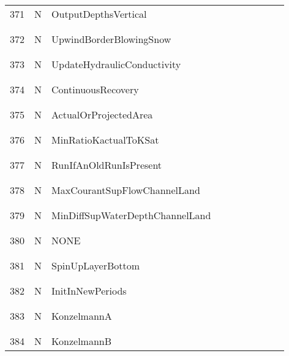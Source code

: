 \begin{longtable}{|c|c|l|c|c|c|c|p{}|c|p{}|}
371 & N & OutputDepthsVertical & & & & & & & \\
&&&&&&&&&\\\hline%
&&&&&&&&&\\
372 & N & UpwindBorderBlowingSnow & & & & & & & \\
&&&&&&&&&\\\hline%
&&&&&&&&&\\
373 & N & UpdateHydraulicConductivity & & & & & & & \\
&&&&&&&&&\\\hline%
&&&&&&&&&\\
374 & N & ContinuousRecovery & & & & & & & \\
&&&&&&&&&\\\hline%
&&&&&&&&&\\
375 & N & ActualOrProjectedArea & & & & & & & \\
&&&&&&&&&\\\hline%
&&&&&&&&&\\
376 & N & MinRatioKactualToKSat & & & & & & & \\
&&&&&&&&&\\\hline%
&&&&&&&&&\\
377 & N & RunIfAnOldRunIsPresent & & & & & & & \\
&&&&&&&&&\\\hline%
&&&&&&&&&\\
378 & N & MaxCourantSupFlowChannelLand & & & & & & & \\
&&&&&&&&&\\\hline%
&&&&&&&&&\\
379 & N & MinDiffSupWaterDepthChannelLand & & & & & & & \\
&&&&&&&&&\\\hline%
&&&&&&&&&\\
380 & N & NONE & & & & & & & \\
&&&&&&&&&\\\hline%
&&&&&&&&&\\
381 & N & SpinUpLayerBottom & & & & & & & \\
&&&&&&&&&\\\hline%
&&&&&&&&&\\
382 & N & InitInNewPeriods & & & & & & & \\
&&&&&&&&&\\\hline%
&&&&&&&&&\\
383 & N & KonzelmannA & & & & & & & \\
&&&&&&&&&\\\hline%
&&&&&&&&&\\
384 & N & KonzelmannB & & & & & & & \\

\end{longtable}
